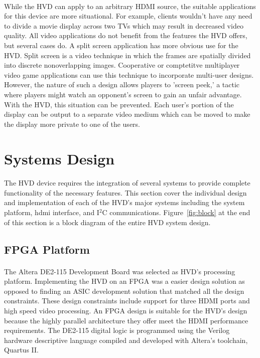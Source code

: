 \documentclass[pdftex,12pt,a4paper]{article}
\begin{document}
\paragraph{}
While the HVD can apply to an arbitrary HDMI source, the suitable applications for this device are more situational. For example, clients wouldn't have any need to divide a movie display across two TVs which may result in decreased video quality. All video applications do not benefit from the features the HVD offers, but several cases do. A split screen application has more obvious use for the HVD. Split screen  is a video technique in which the frames are spatially divided into discrete nonoverlapping images. Cooperative or comptetitve multiplayer video game applications can use this technique to incorporate multi-user designs. However, the nature of such a design allows players to 'screen peek,' a tactic where players might watch an opponent's screen to gain an unfair advantage. With the HVD, this situation can be prevented. Each user's portion of the display can be output to a separate video medium which can be moved to make the display more private to one of the users.

\section{Systems Design}

\paragraph{}
The HVD device requires the integration of several systems to provide complete functionality of the necessary features. This section cover the individual design and implementation of each of the HVD's major systems including the system platform, hdmi interface, and I$^2$C communications. Figure~\ref{fig:block} at the end of this section is a block diagram of the entire HVD system design.

\subsection{FPGA Platform}

\paragraph{}
The Altera DE2-115 Development Board was selected as HVD's processing platform. Implementing the HVD on an FPGA was a easier design solution as opposed to finding an ASIC development solution that matched all the design constraints. These design constraints include support for three HDMI ports and high speed video processing. An FPGA design is suitable for the HVD's design because the highly parallel architecture they offer meet the HDMI performance requirements\cite{TechDoc_FPGA_Benefits}. The DE2-115 digital logic is programmed using the Verilog hardware descriptive language compiled and developed with Altera's toolchain, Quartus II. 
\end{document}
